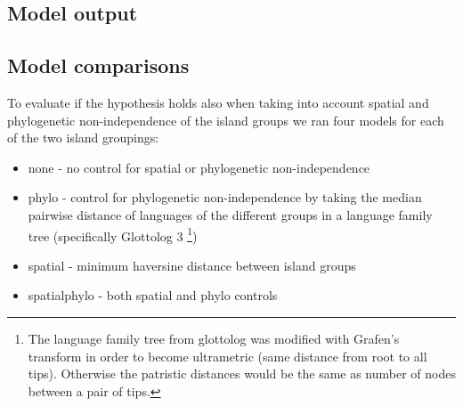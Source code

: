 \documentclass[unnumsec,webpdf,modern,medium]{oup-authoring-template}
\begin{document}



\newpage
\subsection{Model output}











\FloatBarrier
\newpage
\subsection{Model comparisons}
\label{appendix_model_fit_scores}
To evaluate if the hypothesis holds also when taking into account spatial and phylogenetic non-independence of the island groups we ran four models for each of the two island groupings:

\begin{itemize}

    \item none - no control for spatial or phylogenetic non-independence
    \item phylo - control for phylogenetic non-independence by taking the median pairwise distance of languages of the different groups in a language family tree (specifically Glottolog 3 \citet{glottolog3}\footnote{The language family tree from glottolog was modified with Grafen's transform in order to become ultrametric (same distance from root to all tips). Otherwise the patristic distances would be the same as number of nodes between a pair of tips.})
    \item spatial - minimum haversine distance between island groups
    \item spatialphylo - both spatial and phylo controls
    
\end{itemize}
\end{document}
